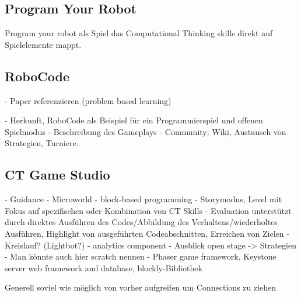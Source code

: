 \subsection{Program Your Robot}
 
\cite{Kazimoglu2012}

Program your robot als Spiel das Computational Thinking skills direkt auf Spielelemente mappt.

\subsection{RoboCode}

- Paper referenzieren (problem based learning)

\cite{RoboCodeWebsite}

- Herkunft, RoboCode als Beispiel für ein Programmierspiel und offenen Spielmodus
- Beschreibung des Gameplays
- Community: Wiki, Austausch von Strategien, Turniere.


\subsection{CT Game Studio}

\cite{Werneburg2018}

- Guidance
- Microworld
- block-based programming
- Storymodus, Level mit Fokus auf spezifischen oder Kombination von CT Skills
- Evaluation unterstützt durch direktes Ausführen des Codes/Abbildung des Verhaltens/wiederholtes Ausführen, Highlight von ausgeführten Codeabschnitten, Erreichen von Zielen
- Kreislauf? (Lightbot?)
- analytics component
- Ausblick open stage -> Strategien
- Man könnte auch hier scratch nennen
- Phaser game framework, Keystone server web framework and database, blockly-Bibliothek

Generell soviel wie möglich von vorher aufgreifen um Connections zu ziehen

